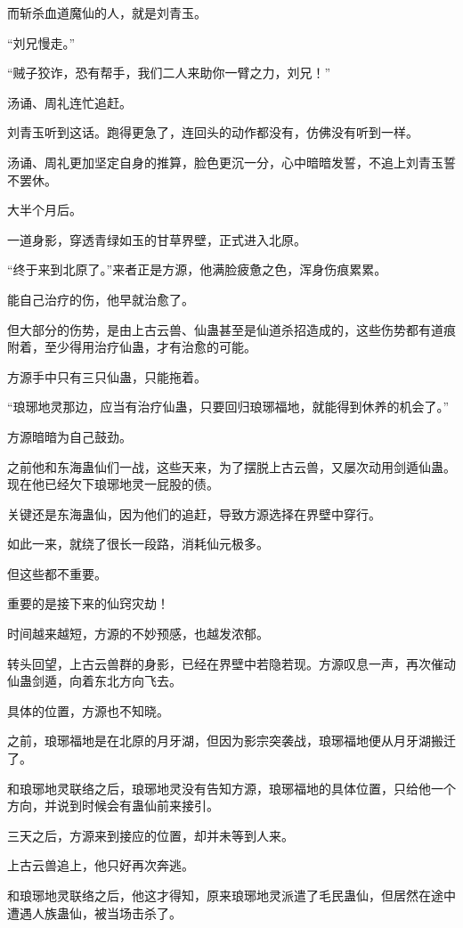 \begin{this_body}
而斩杀血道魔仙的人，就是刘青玉。

“刘兄慢走。”

“贼子狡诈，恐有帮手，我们二人来助你一臂之力，刘兄！”

汤诵、周礼连忙追赶。

刘青玉听到这话。跑得更急了，连回头的动作都没有，仿佛没有听到一样。

汤诵、周礼更加坚定自身的推算，脸色更沉一分，心中暗暗发誓，不追上刘青玉誓不罢休。

大半个月后。

一道身影，穿透青绿如玉的甘草界壁，正式进入北原。

“终于来到北原了。”来者正是方源，他满脸疲惫之色，浑身伤痕累累。

能自己治疗的伤，他早就治愈了。

但大部分的伤势，是由上古云兽、仙蛊甚至是仙道杀招造成的，这些伤势都有道痕附着，至少得用治疗仙蛊，才有治愈的可能。

方源手中只有三只仙蛊，只能拖着。

“琅琊地灵那边，应当有治疗仙蛊，只要回归琅琊福地，就能得到休养的机会了。”

方源暗暗为自己鼓劲。

之前他和东海蛊仙们一战，这些天来，为了摆脱上古云兽，又屡次动用剑遁仙蛊。现在他已经欠下琅琊地灵一屁股的债。

关键还是东海蛊仙，因为他们的追赶，导致方源选择在界壁中穿行。

如此一来，就绕了很长一段路，消耗仙元极多。

但这些都不重要。

重要的是接下来的仙窍灾劫！

时间越来越短，方源的不妙预感，也越发浓郁。

转头回望，上古云兽群的身影，已经在界壁中若隐若现。方源叹息一声，再次催动仙蛊剑遁，向着东北方向飞去。

具体的位置，方源也不知晓。

之前，琅琊福地是在北原的月牙湖，但因为影宗突袭战，琅琊福地便从月牙湖搬迁了。

和琅琊地灵联络之后，琅琊地灵没有告知方源，琅琊福地的具体位置，只给他一个方向，并说到时候会有蛊仙前来接引。

三天之后，方源来到接应的位置，却并未等到人来。

上古云兽追上，他只好再次奔逃。

和琅琊地灵联络之后，他这才得知，原来琅琊地灵派遣了毛民蛊仙，但居然在途中遭遇人族蛊仙，被当场击杀了。


\end{this_body}
